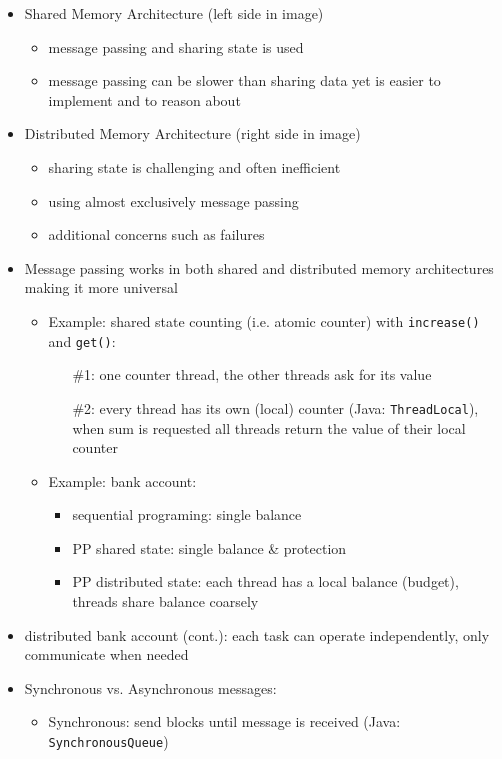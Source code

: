 \documentclass[a4paper]{article}
\newcommand{\inline}[1]{\lstinline!#1!}%
\begin{document}
\begin{itemize}
\item Shared Memory Architecture (left side in image)
\begin{itemize}
\item message passing and sharing state is used
\item message passing can be slower than sharing data yet is easier to implement and to reason about 
\end{itemize}
\item Distributed Memory Architecture (right side in image)
\begin{itemize}
\item sharing state is challenging and often inefficient
\item using almost exclusively message passing
\item additional concerns such as failures
\end{itemize}
\item Message passing works in both shared and distributed memory architectures making it more universal
\begin{itemize}
\item Example: shared state counting (i.e. atomic counter) with \inline{increase()} and \inline{get()}: 
\begin{enumerate}
\item[\#1:] one counter thread, the other threads ask for its value
\item[\#2:] every thread has its own (local) counter (Java: \inline{ThreadLocal}), when sum is requested all threads return the value of their local counter
\end{enumerate}
\item Example: bank account: 
\begin{itemize}
\item sequential programing: single balance
\item PP shared state: single balance \& protection
\item PP distributed state: each thread has a local balance (budget), threads share balance coarsely 
\end{itemize}
\end{itemize}
\item distributed bank account (cont.): each task can operate independently, only communicate when needed
\item Synchronous vs. Asynchronous messages: 
\begin{itemize}
\item Synchronous: send blocks until message is received (Java: \inline{SynchronousQueue})

\end{itemize}
\end{itemize}
\end{document}

